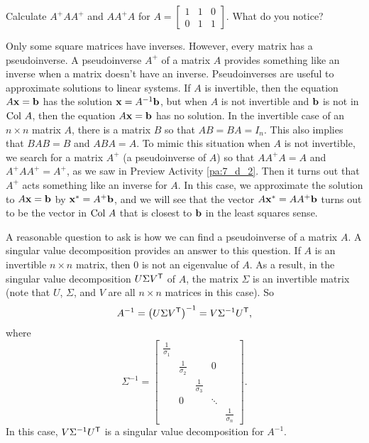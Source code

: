 \begin{pa}
 	\item Calculate $A^+AA^+$ and $AA^+A$ for $A = \left[\begin{array}{ccc} 1&1&0\\ 0&1&1 \end{array} \right]$. What do you notice?

	\ea
	
\ee

\end{pa}

Only some square matrices have inverses. However, every matrix has a pseudoinverse. A pseudoinverse $A^{+}$ of a matrix $A$ provides something like an inverse when a matrix doesn't have an inverse. Pseudoinverses are useful to approximate solutions to linear systems. If $A$ is invertible, then the  equation $A \mathbf{x} = \mathbf{b}$ has the solution $\mathbf{x} = A^{-1}\mathbf{b}$, but when $A$ is not invertible and $\mathbf{b}$ is not in $\text{Col } A$, then the equation $A \mathbf{x} = \mathbf{b}$ has no solution. In the invertible case of an $n \times n$ matrix $A$, there is a matrix $B$ so that $AB = BA = I_n$. This also implies that $BAB = B$ and $ABA = A$. To mimic this situation when $A$ is not invertible, we search for a matrix $A^+$ (a pseudoinverse of $A$) so that $AA^+A = A$ and $A^+AA^+ = A^+$, as we saw in Preview Activity \ref{pa:7_d_2}. Then it turns out that $A^+$ acts something like an inverse for $A$. In this case, we approximate the solution to $A \mathbf{x} = \mathbf{b}$ by $\mathbf{x}^* = A^+\mathbf{b}$, and we will see that the vector $A\mathbf{x}^* = AA^+\mathbf{b}$ turns out to be the vector in $\text{Col } A$ that is closest to $\mathbf{b}$ in the least squares sense. 

A reasonable question to ask is how we can find a pseudoinverse of a matrix $A$. A singular value decomposition provides an answer to this question. If $A$ is an invertible $n \times n$ matrix, then 0 is not an eigenvalue of $A$. As a result, in the  singular value decomposition $U \Sigma V^{\mathsf{T}}$ of $A$, the matrix $\Sigma$ is an invertible matrix (note that $U$, $\Sigma$, and $V$ are all $n \times n$ matrices in this case). So
\[A^{-1} = \left(U \Sigma V^{\mathsf{T}}\right)^{-1} = V \Sigma^{-1} U^{\mathsf{T}},\]
where
\[\Sigma^{-1} = \left[ \begin{array}{ccccc} \frac{1}{\sigma_1}&&&& \\  & \frac{1}{\sigma_2}&&0& \\  && \frac{1}{\sigma_3}&& \\ &0  & & \ddots &  \\ &&&& \frac{1}{\sigma_n} \end{array} \right].\]
In this case, $V \Sigma^{-1} U^{\mathsf{T}}$ is a singular value decomposition for $A^{-1}$.

